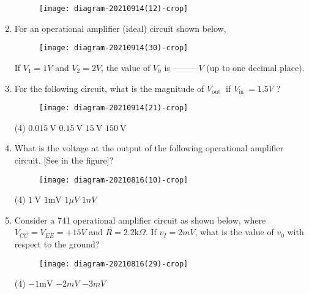 \begin{enumerate}
 	{}
 	\begin{figure}[H]
 		\centering
 		\texttt{[image: diagram-20210914(12)-crop]}
 	\end{figure}
 	\item For an operational amplifier (ideal) circuit shown below,\\
 	\begin{figure}[H]
 		\centering
 		\texttt{[image: diagram-20210914(30)-crop]}
 		\caption{}
 		\label{}
 	\end{figure}
 	If $V_{1}=1 V$ and $V_{2}=2 V$, the value of $V_{0}$ is ---------$V$ (up to one decimal place).
 	{	}
 	\item For the following circuit, what is the magnitude of $V_{\text {out }}$ if $V_{\text {in }}=1.5 V$ ?
 	{	}
 	\begin{figure}[H]
 		\centering
 		\texttt{[image: diagram-20210914(21)-crop]}
 	\end{figure}
 	\begin{tasks}(4)
 		\task[\textbf{A.}] $0.015 \mathrm{~V}$
 		\task[\textbf{B.}] $0.15 \mathrm{~V}$
 		\task[\textbf{C.}] $15 \mathrm{~V}$
 		\task[\textbf{D.}] $150 \mathrm{~V}$
 	\end{tasks}
 	\item What is the voltage at the output of the following operational amplifier circuit. [See in the figure]?
 	{	}
 	\begin{figure}[H]
 		\centering
 		\texttt{[image: diagram-20210816(10)-crop]}
 	\end{figure}
 	\begin{tasks}(4)
 		\task[\textbf{A.}] $1 \mathrm{~V}$
 		\task[\textbf{B.}] $1 \mathrm{mV}$
 		\task[\textbf{C.}] $1 \mu V$
 		\task[\textbf{D.}] $1 n V$
 	\end{tasks}
 	\item Consider a 741 operational amplifier circuit as shown below, where $V_{C C}=V_{E E}=+15 V$ and $R=2.2 \mathrm{k} \Omega$. If $v_{I}=2 m V$, what is the value of $v_{0}$ with respect to the ground?
 	{	}
 	\begin{figure}[H]
 		\centering
 		\texttt{[image: diagram-20210816(29)-crop]}
 	\end{figure}
 	\begin{tasks}(4)
 		\task[\textbf{A.}] $-1 \mathrm{mV}$
 		\task[\textbf{B.}] $-2 m V$
 		\task[\textbf{C.}] $-3 m V$

\end{tasks}
\end{enumerate}
